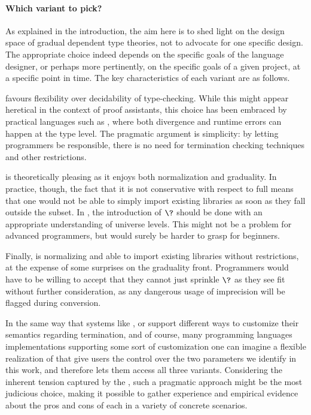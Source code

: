 \paragraph{Which variant to pick?}
As explained in the introduction, the aim here is to shed light on the design space of gradual
dependent type theories, not to advocate for one specific design.
%
The appropriate choice indeed depends on the specific goals of the language designer,
or perhaps more pertinently, on the specific goals of a given project,
at a specific point in time.
The key characteristics of each variant are as follows.

 favours flexibility over decidability of type-checking. While this might appear
heretical in the context of proof assistants, this choice has been embraced by practical languages such as  ,
where both divergence and runtime errors can happen at the type
level. The pragmatic argument is simplicity: by letting programmers be responsible,
there is no need for termination checking techniques and other restrictions.

 is theoretically pleasing as it enjoys both normalization and graduality.
In practice, though, the fact that it is not conservative with respect to full 
means that one would not be able to simply import existing libraries as soon as they
fall outside the  subset.
In , the introduction of $\?$ should be done with an appropriate understanding of
universe levels. This might not be a problem for advanced programmers,
but would surely be harder to grasp for beginners.

Finally,  is normalizing and able to import existing libraries without restrictions,
at the expense of some surprises on the graduality front.
Programmers would have to be willing to accept that they cannot just sprinkle $\?$
as they see fit without further consideration,
as any dangerous usage of imprecision will be flagged during conversion.

In the same way that systems like ,  or  support
different ways to customize their semantics regarding termination,%
and of course, many programming languages implementations supporting some sort of customization%
one can imagine a flexible realization of  that give users the control over the two
parameters we identify in this work, and therefore lets them access all three  variants.
%
Considering the inherent tension captured by the ,
such a pragmatic approach might be the most judicious choice,
making it possible to gather experience and empirical evidence about
the pros and cons of each in a variety of concrete scenarios.

